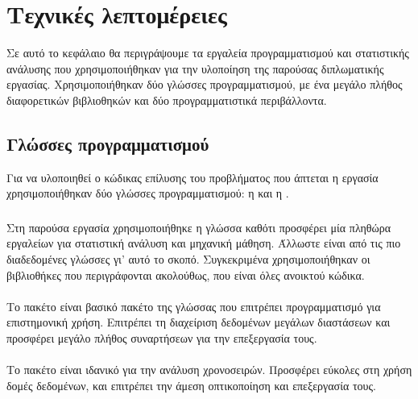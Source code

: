\chapter{Τεχνικές λεπτομέρειες}
\label{chap7}

Σε αυτό το κεφάλαιο θα περιγράψουμε τα εργαλεία προγραμματισμού και στατιστικής ανάλυσης που χρησιμοποιήθηκαν για την υλοποίηση της παρούσας διπλωματικής εργασίας. Χρησιμοποιήθηκαν δύο γλώσσες προγραμματισμού, με ένα μεγάλο πλήθος διαφορετικών βιβλιοθηκών και δύο προγραμματιστικά περιβάλλοντα.

\section{Γλώσσες προγραμματισμού}

Για να υλοποιηθεί ο κώδικας επίλυσης του προβλήματος που άπτεται η εργασία χρησιμοποιήθηκαν δύο γλώσσες προγραμματισμού: η  και η .

\subsection{}

Στη παρούσα εργασία χρησιμοποιήθηκε η γλώσσα  καθότι προσφέρει μία πληθώρα εργαλείων για στατιστική ανάλυση και μηχανική μάθηση. Άλλωστε είναι από τις πιο διαδεδομένες γλώσσες γι' αυτό το σκοπό. Συγκεκριμένα χρησιμοποιήθηκαν οι βιβλιοθήκες που περιγράφονται ακολούθως, που είναι όλες ανοικτού κώδικα.

\subsubsection{}

Το πακέτο  είναι βασικό πακέτο της γλώσσας  που επιτρέπει προγραμματισμό για επιστημονική χρήση. Επιτρέπει τη διαχείριση δεδομένων μεγάλων διαστάσεων και προσφέρει μεγάλο πλήθος συναρτήσεων για την επεξεργασία τους.

\subsubsection{}

Το πακέτο  είναι ιδανικό για την ανάλυση χρονοσειρών. Προσφέρει εύκολες στη χρήση δομές δεδομένων, και επιτρέπει την άμεση οπτικοποίηση και επεξεργασία τους.

\subsubsection{}

